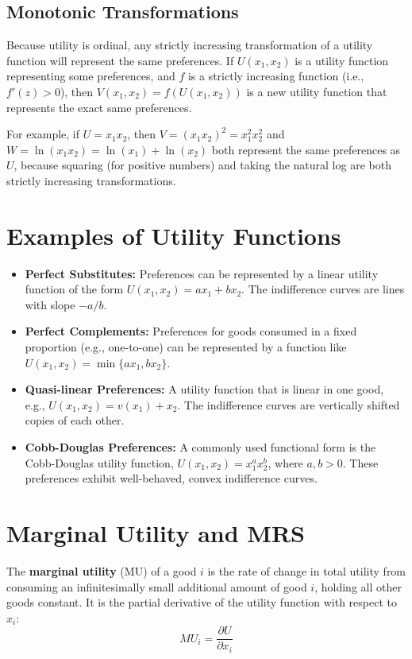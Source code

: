 \subsection{Monotonic Transformations}
Because utility is ordinal, any strictly increasing transformation of a utility function will represent the same preferences. If $U(x_1, x_2)$ is a utility function representing some preferences, and $f$ is a strictly increasing function (i.e., $f'(z)>0$), then $V(x_1, x_2) = f(U(x_1, x_2))$ is a new utility function that represents the exact same preferences.

For example, if $U = x_1x_2$, then $V = {(x_1 x_2)}^{2} = x_1^{2}x_2^{2}$ and $W = \ln(x_1x_2) = \ln(x_1) + \ln(x_2)$ both represent the same preferences as $U$, because squaring (for positive numbers) and taking the natural log are both strictly increasing transformations.

\section{Examples of Utility Functions}

\begin{itemize}
    \item \textbf{Perfect Substitutes:} Preferences can be represented by a linear utility function of the form $U(x_1, x_2) = ax_1 + bx_2$. The indifference curves are lines with slope $-a/b$.
    \item \textbf{Perfect Complements:} Preferences for goods consumed in a fixed proportion (e.g., one-to-one) can be represented by a function like $U(x_1, x_2) = \min\{ax_1, bx_2\}$.
    \item \textbf{Quasi-linear Preferences:} A utility function that is linear in one good, e.g., $U(x_1, x_2) = v(x_1) + x_2$. The indifference curves are vertically shifted copies of each other.
    \item \textbf{Cobb-Douglas Preferences:} A commonly used functional form is the Cobb-Douglas utility function, $U(x_1, x_2) = x_1^a x_2^b$, where $a, b > 0$. These preferences exhibit well-behaved, convex indifference curves.
\end{itemize}

\section{Marginal Utility and MRS}

\begin{definition}
The \textbf{marginal utility} (MU) of a good $i$ is the rate of change in total utility from consuming an infinitesimally small additional amount of good $i$, holding all other goods constant. It is the partial derivative of the utility function with respect to $x_i$:
\[ MU_i = \frac{\partial U}{\partial x_i} \]
\end{definition}

